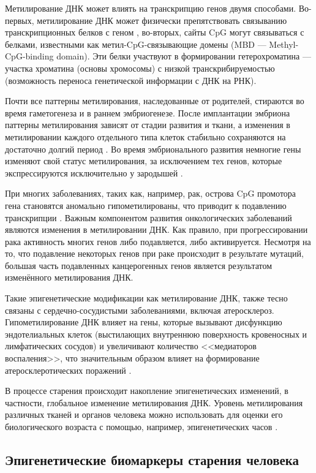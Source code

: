 Метилирование ДНК может влиять на транскрипцию генов двумя способами. Во-первых, метилирование ДНК может физически препятствовать связыванию транскрипционных белков с геном \autocite{Choy2010}, во-вторых, сайты CpG могут связываться с белками, известными как метил-CpG-связывающие домены (MBD --- Methyl-CpG-binding domain). Эти белки участвуют в формировании гетерохроматина --- участка хроматина (основы хромосомы) с низкой транскрибируемостью (возможность переноса генетической информации с ДНК на РНК). 

Почти все паттерны метилирования, наследованные от родителей, стираются во время гаметогенеза и в раннем эмбриогенезе. После имплантации эмбриона паттерны метилирования зависят от стадии развития и ткани, а изменения в метилировании каждого отдельного типа клеток стабильно сохраняются на достаточно долгий период \autocite{Cedar2012}. Во время эмбрионального развития немногие гены изменяют свой статус метилирования, за исключением тех генов, которые экспрессируются исключительно у зародышей \autocite{Borgel2010}.

При многих заболеваниях, таких как, например, рак, острова CpG промотора гена становятся аномально гипометилированы, что приводит к подавлению транскрипции \autocite{Wang2018Cancer}. Важным компонентом развития онкологических заболеваний являются изменения в метилировании ДНК. Как правило, при прогрессировании рака активность многих генов либо подавляется, либо активируется. Несмотря на то, что подавление некоторых генов при раке происходит в результате мутаций, большая часть подавленных канцерогенных генов является результатом изменённого метилирования ДНК. 

Такие эпигенетические модификации как метилирование ДНК, также тесно связаны с сердечно-сосудистыми заболеваниями, включая атеросклероз. Гипометилирование ДНК влияет на гены, которые вызывают дисфункцию эндотелиальных клеток (выстилающих внутреннюю поверхность кровеносных и лимфатических сосудов) и увеличивают количество <<медиаторов воспаления>>, что значительным образом влияет на формирование атеросклеротических поражений \autocite{Castro2003}. 

В процессе старения происходит накопление эпигенетических изменений, в частности, глобальное изменение метилирования ДНК. Уровень метилирования различных тканей и органов человека можно использовать для оценки его биологического возраста с помощью, например, эпигенетических часов \autocite{Horvath2013}. 

\subsection{Эпигенетические биомаркеры старения человека}\label{subsec:ch1/sec1/subsec3}

